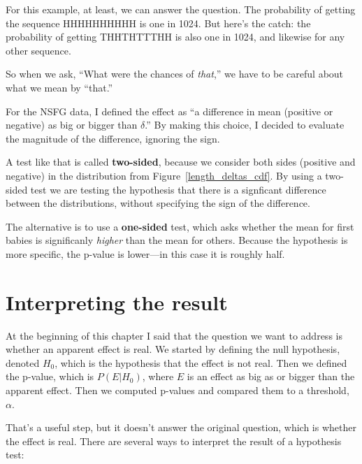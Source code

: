 \documentclass[12pt]{book}
\begin{document}
For this example, at least, we can answer the question.  The
probability of getting the sequence HHHHHHHHHH is one in 1024.  But
here's the catch: the probability of getting THHTHTTTHH is also one in
1024, and likewise for any other sequence.

So when we ask, ``What were the chances of {\em that},'' we have
to be careful about what we mean by ``that.''

For the NSFG data, I defined the effect as ``a difference in mean
(positive or negative) as big or bigger than $\delta$.''  By making
this choice, I decided to evaluate the magnitude of the difference,
ignoring the sign.

A test like that is called {\bf two-sided}, because we consider both
sides (positive and negative) in the distribution from
Figure~\ref{length_deltas_cdf}.  By using a two-sided test we are
testing the hypothesis that there is a signficant difference between
the distributions, without specifying the sign of the difference.

The alternative is to use a {\bf one-sided} test, which asks whether
the mean for first babies is significanly {\em higher} than
the mean for others.  Because the hypothesis is more specific, the
p-value is lower---in this case it is roughly half.


\section{Interpreting the result}

At the beginning of this chapter I said that the question we want to
address is whether an apparent effect is real.  We started by defining
the null hypothesis, denoted $H_0$, which is the
hypothesis that the effect is not real.  Then we defined the p-value,
which is $P(E | H_0)$, where $E$ is an effect as big as or bigger than
the apparent effect.  Then we computed p-values and compared
them to a threshold, $\alpha$.

That's a useful step, but it doesn't answer the original question,
which is whether the effect is real.  There are several ways to
interpret the result of a hypothesis test:
\end{document}
